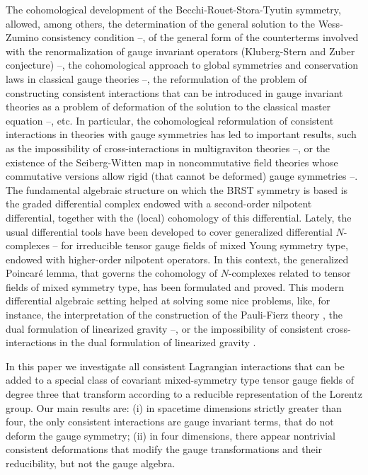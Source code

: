 \documentclass[a4paper,12pt]{article}
\begin{document}
The cohomological development of the Becchi-Rouet-Stora-Tyutin symmetry,
allowed, among others, the determination of the general solution to the
Wess-Zumino consistency condition \cite{1and2}--\cite{10and23}, of the
general form of the counterterms involved with the renormalization of gauge
invariant operators (Kluberg-Stern and Zuber conjecture) \cite{6and23}--\cite
{12and3}, the cohomological approach to global symmetries and conservation
laws in classical gauge theories \cite{13and4}--\cite{16and4}, the
reformulation of the problem of constructing consistent interactions that
can be introduced in gauge invariant theories as a problem of deformation of
the solution to the classical master equation \cite{17and5}--\cite{21and5},
etc. In particular, the cohomological reformulation of consistent
interactions in theories with gauge symmetries has led to important results,
such as the impossibility of cross-interactions in multigraviton theories 
\cite{22and6}--\cite{24and6}, or the existence of the Seiberg-Witten map in
noncommutative field theories whose commutative versions allow rigid (that
cannot be deformed) gauge symmetries \cite{25and7}--\cite{27and7}. The
fundamental algebraic structure on which the BRST symmetry is based is the
graded differential complex endowed with a second-order nilpotent
differential, together with the (local) cohomology of this differential.
Lately, the usual differential tools have been developed to cover
generalized differential $N$-complexes \cite{28and8}--\cite{29and810} for
irreducible tensor gauge fields of mixed Young symmetry type, endowed with
higher-order nilpotent operators. In this context, the generalized
Poincar\'{e} lemma, that governs the cohomology of $N$-complexes related to
tensor fields of mixed symmetry type, has been formulated and proved. This
modern differential algebraic setting helped at solving some nice problems,
like, for instance, the interpretation of the construction of the
Pauli-Fierz theory \cite{30and9}, the dual formulation of linearized gravity 
\cite{31and9}--\cite{31and11}, or the impossibility of consistent
cross-interactions in the dual formulation of linearized gravity \cite
{31and11}.

In this paper we investigate all consistent Lagrangian interactions that can
be added to a special class of covariant mixed-symmetry type tensor gauge
fields of degree three that transform according to a reducible
representation of the Lorentz group. Our main results are: (i) in spacetime
dimensions strictly greater than four, the only consistent interactions are
gauge invariant terms, that do not deform the gauge symmetry; (ii) in four
dimensions, there appear nontrivial consistent deformations that modify the
gauge transformations and their reducibility, but not the gauge algebra.
\end{document}
